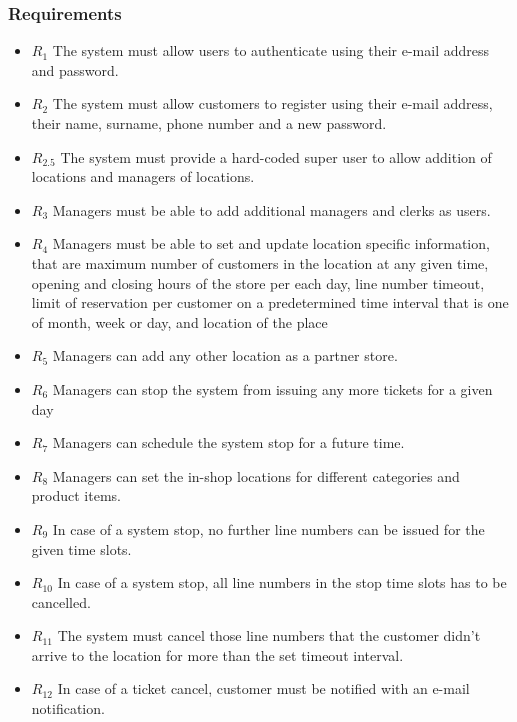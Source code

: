 \subsubsection{Requirements}
\begin{itemize}
    \item \textbf{$R_1$} The system must allow users to authenticate using their e-mail address and password. %
    \item \textbf{$R_2$} The system must allow customers to register using their e-mail address, their name, surname, phone number and a new password.
    \item \textbf{$R_{2.5}$} The system must provide a hard-coded super user to allow addition of locations and managers of locations. %
    \item \textbf{$R_3$} Managers must be able to add additional managers and clerks as users.
    \item \textbf{$R_4$} Managers must be able to set and update location specific information, that are maximum number of customers in the location at any given time, opening and closing hours of the store per each day, line number timeout, limit of reservation per customer on a predetermined time interval that is one of month, week or day, and location of the place %
    \item \textbf{$R_5$} Managers can add any other location as a partner store.
    \item \textbf{$R_6$} Managers can stop the system from issuing any more tickets for a given day
    \item \textbf{$R_7$} Managers can schedule the system stop for a future time.
    \item \textbf{$R_8$} Managers can set the in-shop locations for different categories and product items.
    \item \textbf{$R_9$} In case of a system stop, no further line numbers can be issued for the given time slots.
    \item \textbf{$R_{10}$} In case of a system stop, all line numbers in the stop time slots has to be cancelled.
    \item \textbf{$R_{11}$} The system must cancel those line numbers that the customer didn't arrive to the location for more than the set timeout interval.
    \item \textbf{$R_{12}$} In case of a ticket cancel, customer must be notified with an e-mail notification. %

\end{itemize}
